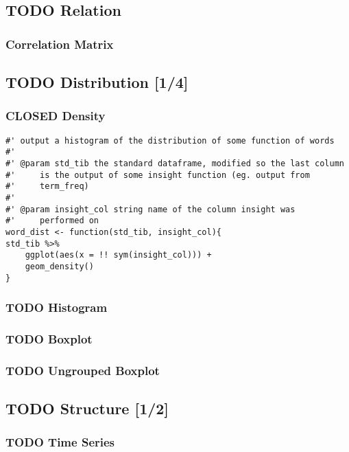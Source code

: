 \documentclass[a4paper, 11pt]{article}
\begin{document}
\subsection{{\bfseries\sffamily TODO} Relation}
\label{sec:orgc1795bb}
\subsubsection{Correlation Matrix}
\label{sec:org3435365}
\subsection{{\bfseries\sffamily TODO} Distribution [1/4]}
\label{sec:org95e4774}
\subsubsection{{\bfseries\sffamily CLOSED} Density}
\label{sec:orga9b5ac6}
\begin{verbatim}
#' output a histogram of the distribution of some function of words
#'
#' @param std_tib the standard dataframe, modified so the last column
#'     is the output of some insight function (eg. output from
#'     term_freq)
#'
#' @param insight_col string name of the column insight was
#'     performed on
word_dist <- function(std_tib, insight_col){
std_tib %>%
    ggplot(aes(x = !! sym(insight_col))) +
    geom_density()
}
\end{verbatim}
\subsubsection{{\bfseries\sffamily TODO} Histogram}
\label{sec:orgcf8572c}
\subsubsection{{\bfseries\sffamily TODO} Boxplot}
\label{sec:org8115a32}
\subsubsection{{\bfseries\sffamily TODO} Ungrouped Boxplot}
\label{sec:org1fe3500}
\subsection{{\bfseries\sffamily TODO} Structure [1/2]}
\label{sec:org460d664}
\subsubsection{{\bfseries\sffamily TODO} Time Series}
\label{sec:orgbdcbe4c}
\end{document}
